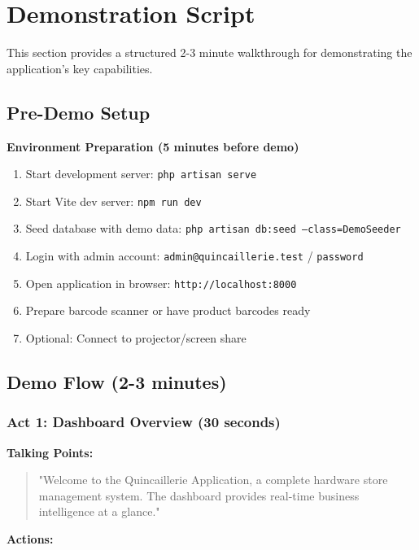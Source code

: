 \section{Demonstration Script}

This section provides a structured 2-3 minute walkthrough for demonstrating the application's key capabilities.

\subsection{Pre-Demo Setup}

\textbf{Environment Preparation (5 minutes before demo)}

\begin{enumerate}[leftmargin=*]
    \item Start development server: \texttt{php artisan serve}
    \item Start Vite dev server: \texttt{npm run dev}
    \item Seed database with demo data: \texttt{php artisan db:seed --class=DemoSeeder}
    \item Login with admin account: \texttt{admin@quincaillerie.test} / \texttt{password}
    \item Open application in browser: \texttt{http://localhost:8000}
    \item Prepare barcode scanner or have product barcodes ready
    \item Optional: Connect to projector/screen share
\end{enumerate}

\subsection{Demo Flow (2-3 minutes)}

\subsubsection{Act 1: Dashboard Overview (30 seconds)}

\textbf{Talking Points:}

\begin{quote}
"Welcome to the Quincaillerie Application, a complete hardware store management system. The dashboard provides real-time business intelligence at a glance."
\end{quote}

\textbf{Actions:}


